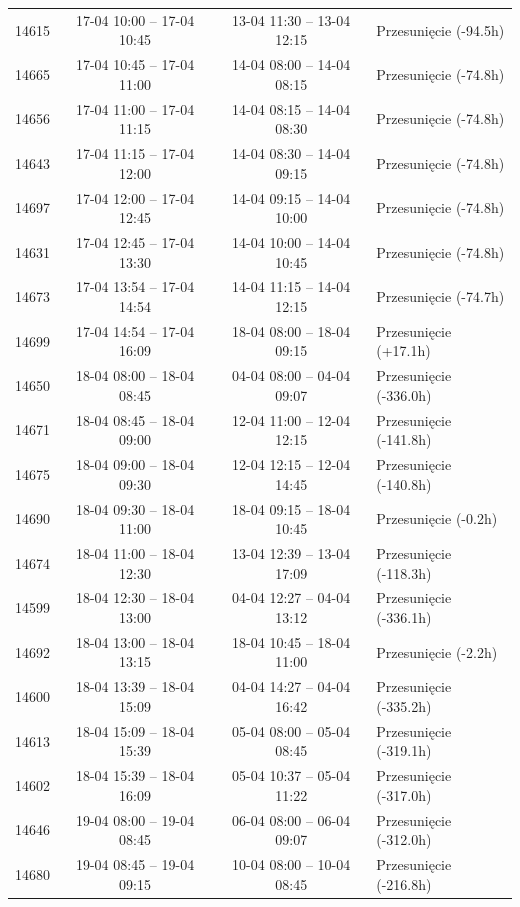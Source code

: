 \begin{table}[htbp]
\begin{tabular}{|r|c|c|l|}
14615 & 17-04 10:00 -- 17-04 10:45 & 13-04 11:30 -- 13-04 12:15 & Przesunięcie (-94.5h) \\ 
14665 & 17-04 10:45 -- 17-04 11:00 & 14-04 08:00 -- 14-04 08:15 & Przesunięcie (-74.8h) \\ 
14656 & 17-04 11:00 -- 17-04 11:15 & 14-04 08:15 -- 14-04 08:30 & Przesunięcie (-74.8h) \\ 
14643 & 17-04 11:15 -- 17-04 12:00 & 14-04 08:30 -- 14-04 09:15 & Przesunięcie (-74.8h) \\ 
14697 & 17-04 12:00 -- 17-04 12:45 & 14-04 09:15 -- 14-04 10:00 & Przesunięcie (-74.8h) \\ 
14631 & 17-04 12:45 -- 17-04 13:30 & 14-04 10:00 -- 14-04 10:45 & Przesunięcie (-74.8h) \\ 
14673 & 17-04 13:54 -- 17-04 14:54 & 14-04 11:15 -- 14-04 12:15 & Przesunięcie (-74.7h) \\ 
14699 & 17-04 14:54 -- 17-04 16:09 & 18-04 08:00 -- 18-04 09:15 & Przesunięcie (+17.1h) \\ 
14650 & 18-04 08:00 -- 18-04 08:45 & 04-04 08:00 -- 04-04 09:07 & Przesunięcie (-336.0h) \\ 
14671 & 18-04 08:45 -- 18-04 09:00 & 12-04 11:00 -- 12-04 12:15 & Przesunięcie (-141.8h) \\ 
14675 & 18-04 09:00 -- 18-04 09:30 & 12-04 12:15 -- 12-04 14:45 & Przesunięcie (-140.8h) \\ 
14690 & 18-04 09:30 -- 18-04 11:00 & 18-04 09:15 -- 18-04 10:45 & Przesunięcie (-0.2h) \\ 
14674 & 18-04 11:00 -- 18-04 12:30 & 13-04 12:39 -- 13-04 17:09 & Przesunięcie (-118.3h) \\ 
14599 & 18-04 12:30 -- 18-04 13:00 & 04-04 12:27 -- 04-04 13:12 & Przesunięcie (-336.1h) \\ 
14692 & 18-04 13:00 -- 18-04 13:15 & 18-04 10:45 -- 18-04 11:00 & Przesunięcie (-2.2h) \\ 
14600 & 18-04 13:39 -- 18-04 15:09 & 04-04 14:27 -- 04-04 16:42 & Przesunięcie (-335.2h) \\ 
14613 & 18-04 15:09 -- 18-04 15:39 & 05-04 08:00 -- 05-04 08:45 & Przesunięcie (-319.1h) \\ 
14602 & 18-04 15:39 -- 18-04 16:09 & 05-04 10:37 -- 05-04 11:22 & Przesunięcie (-317.0h) \\ 
14646 & 19-04 08:00 -- 19-04 08:45 & 06-04 08:00 -- 06-04 09:07 & Przesunięcie (-312.0h) \\ 
14680 & 19-04 08:45 -- 19-04 09:15 & 10-04 08:00 -- 10-04 08:45 & Przesunięcie (-216.8h) \\ 

\end{tabular}
\end{table}
